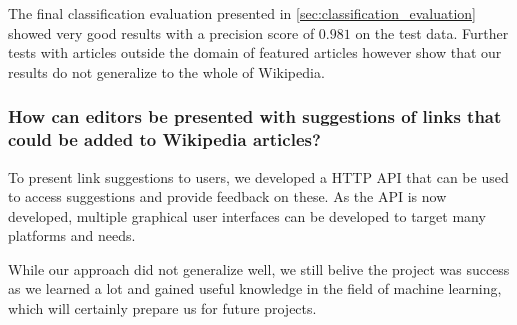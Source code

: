 The final classification evaluation presented in \cref{sec:classification_evaluation} showed very good results with a precision score of $0.981$ on the test data. Further tests with articles outside the domain of featured articles however show that our results do not generalize to the whole of Wikipedia. 


\subsubsection*{How can editors be presented with suggestions of links that could be added to Wikipedia articles?}

To present link suggestions to users, we developed a HTTP API that can be used to access suggestions and provide feedback on these. As the API is now developed, multiple graphical user interfaces can be developed to target many platforms and needs.


While our approach did not generalize well, we still belive the project was success as we learned a lot and gained useful knowledge in the field of machine learning, which will certainly prepare us for future projects.

